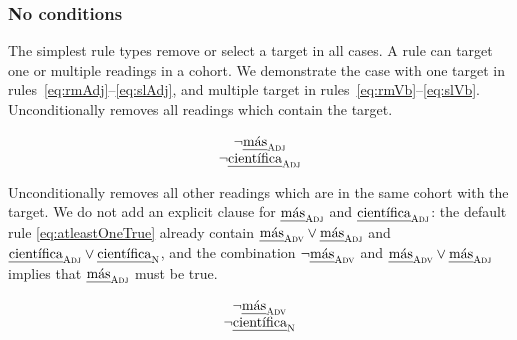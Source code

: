 


\subsubsection{No conditions} 

The simplest rule types remove or select a target in all cases. 
A rule can target one or multiple readings in a cohort. We demonstrate the case with one target in rules~\ref{eq:rmAdj}--\ref{eq:slAdj}, and multiple target in rules~\ref{eq:rmVb}--\ref{eq:slVb}. \\


 Unconditionally removes all readings which contain the target.

\begin{equation}
\begin{array}{c}
\neg{}\masAdj \\
\neg{}\cientificaAdj
\end{array}
\label{eq:rmAdj}
\end{equation}

 Unconditionally removes all other readings which are in the same cohort with the target.
We do not add an explicit clause for $\text{\em m\'{a}s}_{\text{\sc Adj}}$ and $\cientificaAdj$: the default rule \ref{eq:atleastOneTrue} already contain $\text{\em m\'{a}s}_{\text{\sc Adv}} \vee \text{\em m\'{a}s}_{\text{\sc Adj}}$ and $\cientificaAdj \vee \cientificaN$, and the combination $\neg\text{\em m\'{a}s}_{\text{\sc Adv}}$  and $\text{\em m\'{a}s}_{\text{\sc Adv}} \vee \text{\em m\'{a}s}_{\text{\sc Adj}}$  implies that $\text{\em m\'{a}s}_{\text{\sc Adj}}$ must be true. 

\begin{equation}
\begin{array}{c}
\neg{}\masAdv \\
\neg{}\cientificaN
\end{array}
\label{eq:slAdj}
\end{equation}

